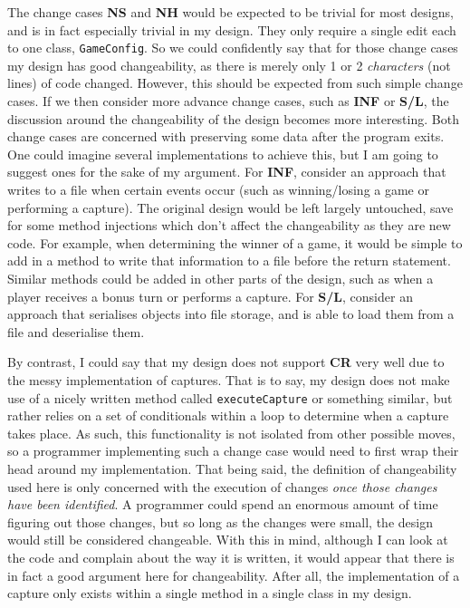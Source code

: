 \documentclass[10pt, a4paper, conference]{IEEEtran}
\begin{document}
The change cases \textbf{NS} and \textbf{NH} would be expected to be trivial
for most designs, and is in fact especially trivial in my design. They only require
a single edit each to one class, \texttt{GameConfig}. So we could confidently
say that for those change cases my design has good changeability, as there is
merely only 1 or 2 \textit{characters} (not lines) of code changed. However,
this should be expected from such simple change cases. If we then consider
more advance change cases, such as \textbf{INF} or \textbf{S/L}, the discussion
around the changeability of the design becomes more interesting. Both change
cases are concerned with preserving some data after the program exits. One
could imagine several implementations to achieve this, but I am going to
suggest ones for the sake of my argument. For \textbf{INF}, consider an
approach that writes to a file when certain events occur (such as
winning/losing a game or performing a capture). The original design would be
left largely untouched, save for some method injections which don't affect the
changeability as they are new code. For example, when determining the winner of
a game, it would be simple to add in a method to write that information to
a file before the return statement. Similar methods could be added in other
parts of the design, such as when a player receives a bonus turn or performs
a capture. For \textbf{S/L}, consider an approach that serialises objects into file storage, and is able to load them
from a file and deserialise them. 

By contrast, I could say that my design does not support \textbf{CR} very well due to the messy
implementation of captures. That is to say, my design does not make use of
a nicely written method called \texttt{executeCapture} or something similar,
but rather relies on a set of conditionals within a loop to determine when
a capture takes place. As such, this functionality is not isolated from other
possible moves, so a programmer implementing such a change case would need to
first wrap their head around my implementation. That being said, the definition
of changeability used here is only concerned with the execution of changes
\textit{once those changes have been identified}. A programmer could spend an
enormous amount of time figuring out those changes, but so long as the changes
were small, the design would still be considered changeable. With this in mind,
although I can look at the code and complain about the way it is written, it
would appear that there is in fact a good argument here for changeability.
After all, the implementation of a capture only exists within a single method
in a single class in my design.
\end{document}
